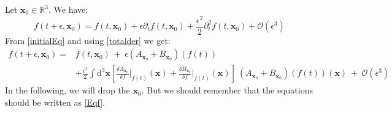 \documentclass[11pt]{article}
\newcommand{\fder}[2]{\frac{\delta #1}{\delta f}\Bigr|_{#2}}
\begin{document}
Let $\mathbf{x}_0\in\mathbb{R}^3$. We have:
$$f(t+\epsilon,\mathbf{x}_0)=f(t,\mathbf{x}_0)+\epsilon\partial_t f(t,\mathbf{x}_0)+\frac{\epsilon^2}{2}\partial_t^2 f(t,\mathbf{x}_0)+\mathcal{O}(\epsilon^3)$$
From \eqref{initialEq} and using \eqref{totalder} we get:
\begin{equation}\label{Eqf}
    \begin{split}
    f(t+\epsilon,\mathbf{x}_0)=&f(t,\mathbf{x}_0)~+~\epsilon (A_{\mathbf{x}_0}+B_{\mathbf{x}_0})(f(t))\\
    &+\frac{\epsilon^2}{2}\int \text{d}^3\mathbf{x}\left[ \fder{A_{\mathbf{x}_0}}{f(t)}(\mathbf{x})+\fder{B_{\mathbf{x}_0}}{f(t)}(\mathbf{x}) \right]~ (A_{\mathbf{x}_0}+B_{\mathbf{x}_0})(f(t))(\mathbf{x}) ~+~\mathcal{O}(\epsilon^3)
    \end{split}
\end{equation}
In the following, we will drop the $\mathbf{x}_0$. But we should remember that the equations should be written as \eqref{Eqf}.\par
\end{document}
